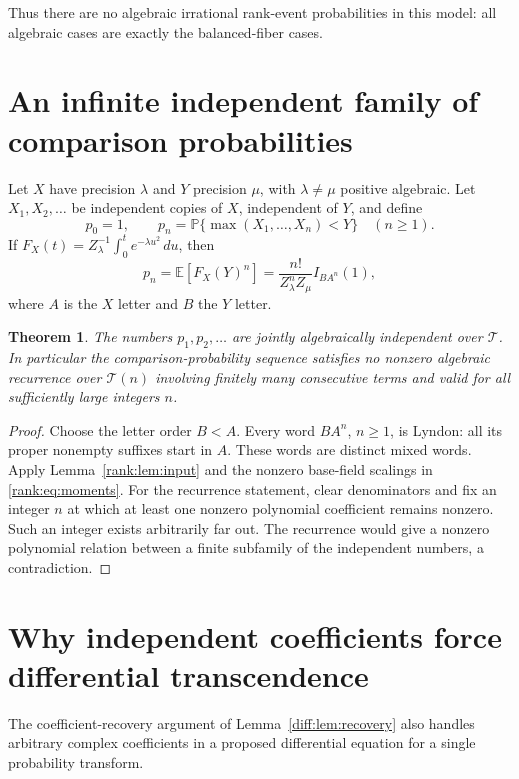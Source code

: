 \documentclass[11pt,a4paper]{article}
\newcommand{\T}{\mathcal T}
\newcommand{\PP}{\mathbb P}
\newcommand{\EE}{\mathbb E}
\newtheorem{theorem}{Theorem}[section]
\theoremstyle{definition}
\theoremstyle{remark}
\numberwithin{equation}{section}
\begin{document}
Thus there are no algebraic irrational rank-event probabilities in
this model: all algebraic cases are exactly the balanced-fiber cases.

\section{An infinite independent family of comparison probabilities}
Let $X$ have precision $\lambda$ and $Y$ precision $\mu$, with
$\lambda\ne\mu$ positive algebraic. Let $X_1,X_2,\ldots$ be
independent copies of $X$, independent of $Y$, and define
\[
 p_0=1,\qquad p_n=\PP\{\max(X_1,\ldots,X_n)<Y\}\quad(n\ge1).
\]
If $F_X(t)=Z_\lambda^{-1}\int_0^te^{-\lambda u^2}\,du$, then
\begin{equation}
 p_n=\EE[F_X(Y)^n]
     =\frac{n!}{Z_\lambda^nZ_\mu}I_{B A^n}(1),
 \label{rank:eq:moments}
\end{equation}
where $A$ is the $X$ letter and $B$ the $Y$ letter.

\begin{theorem}\label{rank:thm:indmoments}
The numbers $p_1,p_2,\ldots$ are jointly algebraically independent
over $\T$. In particular the comparison-probability sequence satisfies
no nonzero algebraic recurrence over $\T(n)$ involving finitely many
consecutive terms and valid for all sufficiently large integers $n$.
\end{theorem}
\begin{proof}
Choose the letter order $B<A$. Every word $BA^n$, $n\ge1$, is
Lyndon: all its proper nonempty suffixes start in $A$. These words
are distinct mixed words. Apply Lemma~\ref{rank:lem:input} and the
nonzero base-field scalings in \eqref{rank:eq:moments}.
For the recurrence statement, clear denominators and fix an integer
$n$ at which at least one nonzero polynomial coefficient remains
nonzero. Such an integer exists arbitrarily far out. The recurrence
would give a nonzero polynomial relation between a finite subfamily
of the independent numbers, a contradiction.
\end{proof}

\section{Why independent coefficients force differential transcendence}
The coefficient-recovery argument of Lemma~\ref{diff:lem:recovery}
also handles arbitrary complex coefficients in a proposed differential
equation for a single probability transform.
\end{document}
